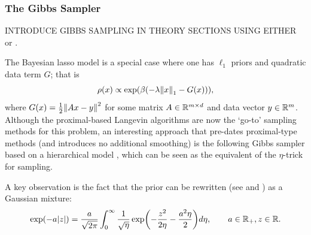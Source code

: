 \documentclass{article}
\begin{document}
\subsubsection{The Gibbs Sampler}
INTRODUCE GIBBS SAMPLING IN THEORY SECTIONS USING EITHER \cite{gelman2013bayesian} or \cite{robert2004monte}.

The Bayesian lasso model is a special case where one has $\ell_1$ priors and quadratic data term $G$; that is
$$
\rho(x) \propto \exp\pa{ \beta \pa{-\lambda \norm{x}_1 - G(x)} },
$$
where $G(x) = \frac12\norm{Ax-y}^2$
for some matrix $A\in \mathbb{R}^{m\times d}$ and data vector $y\in \mathbb{R}^m$. 
Although the proximal-based Langevin algorithms are now the `go-to' sampling methods for this problem,  an interesting approach that  pre-dates  proximal-type methods (and introduces no additional smoothing) is the following Gibbs sampler based on a hierarchical model \cite{park2008bayesian}, which can be seen as the equivalent of the $\eta$-trick for sampling.



A key observation is
 the fact that the prior can be rewritten (see \cite{west1987scale} and \cite{gneiting1997normal}) as a Gaussian mixture:
\begin{equation}\label{eq:laplace}
   \exp\pa{-a\abs{z}} = \frac{a}{ \sqrt{2\pi}}\int_0^\infty \frac{1}{\sqrt{\eta}} \exp\pa{ -\frac{z^2}{2 \eta} - \frac{a^2 \eta}{2}} d\eta, \qquad a\in \real_+,z\in\real.
\end{equation}
\end{document}
